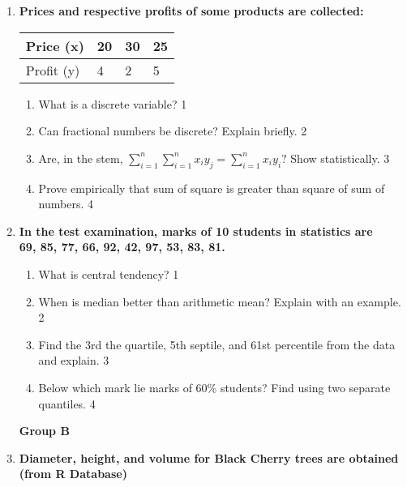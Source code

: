 \documentclass{article}
\begin{document}
\begin{enumerate}
  \item
  \textbf{Prices and respective profits of some products are collected:}
 

\begin{table}[h]
 \begin{center}
\begin{tabular}{l|l|l|l}

Price (x)  & 20 & 30 & 25 \\ \hline
Profit (y) & 4  & 2  & 5  \\ 
\end{tabular}
\end{center}
\end{table}


  \begin{enumerate}
    \item
	What is a discrete variable? \hfill 1
    \item
    	Can fractional numbers be discrete? Explain briefly.  \hfill 2
    \item
    	Are, in the stem, $\displaystyle \sum_{i=1}^{n} \sum_{i=1}^{n} x_iy_j = \sum_{i=1}^{n} x_iy_i?$ Show statistically. \hfill 3
     \item
     	Prove empirically that sum of square is greater than square of sum of numbers. \hfill 4
  \end{enumerate}
  
    \item
  \textbf{In the test examination, marks of 10 students in statistics are \\ 69, 85, 77, 66, 92, 42, 97, 53, 83, 81.}
  \begin{enumerate}
    \item
	What is central tendency? \hfill 1
    \item
	When is median better than arithmetic mean? Explain with an example. \hfill 2
    \item  
	Find the 3rd the quartile, 5th septile, and 61st percentile from the data and explain.  \hfill 3
    \item
	Below which mark lie marks of 60\% students? Find using two separate quantiles. \hfill 4
\end{enumerate}


\begin{center}
\textbf{Group B}
\end{center}

 \item
	  \textbf{Diameter, height, and volume for Black Cherry trees are obtained (from R Database)}
	

\end{enumerate}
\end{document}
